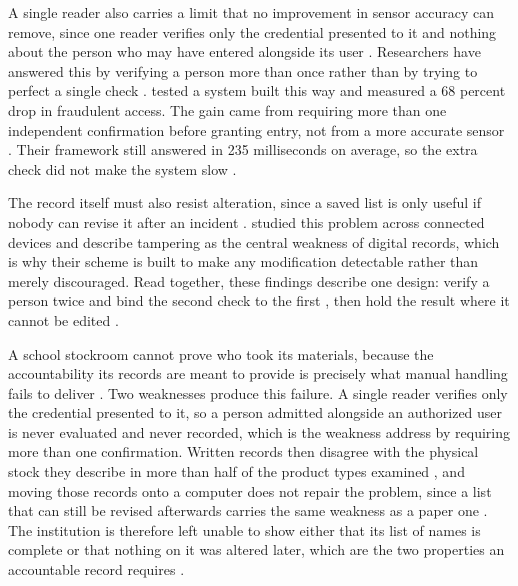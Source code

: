 A single reader also carries a limit that no improvement in sensor accuracy can
remove, since one reader verifies only the credential presented to it and
nothing about the person who may have entered alongside its user
\parencite{mohammed2025}. Researchers have answered this by verifying a person
more than once rather than by trying to perfect a single check
\parencite{mohammed2025}.
\textcite{mohammed2025} tested a system built this way
and measured a 68 percent drop in fraudulent access. The gain came from
requiring more than one independent confirmation before granting entry, not from
a more accurate sensor \parencite{mohammed2025}. Their framework still answered
in 235 milliseconds on average, so the extra check did not make the system slow
\parencite{mohammed2025}.

The record itself must also resist alteration, since a saved list is only
useful if nobody can revise it after an incident \parencite{koisser2023}.
\textcite{koisser2023} studied this problem across connected devices and
describe tampering as the central weakness of digital records, which is why
their scheme is built to make any modification detectable rather than merely
discouraged. Read together, these findings describe one design: verify a person
twice and bind the second check to the first \parencite{mohammed2025}, then hold
the result where it cannot be edited \parencite{koisser2023}.


A school stockroom cannot prove who took its materials, because the
accountability its records are meant to provide is precisely what manual
handling fails to deliver \parencite{cepeda2025}. Two weaknesses produce this
failure. A single reader verifies only the credential presented to it, so a
person admitted alongside an authorized user is never evaluated and never
recorded, which is the weakness \textcite{mohammed2025} address by requiring
more than one confirmation. Written records then disagree with the physical
stock they describe in more than half of the product types examined
\parencite{linuwih2025}, and moving those records onto a computer does not
repair the problem, since a list that can still be revised afterwards carries
the same weakness as a paper one \parencite{koisser2023}. The institution is
therefore left unable to show either that its list of names is complete or that
nothing on it was altered later, which are the two properties an accountable
record requires \parencite{koisser2023, linuwih2025}.

